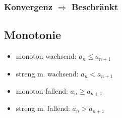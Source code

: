 \subsubsection*{Konvergenz \texorpdfstring{$\Rightarrow$}{folglich} Beschränkt}
\subsection*{Monotonie}
\begin{itemize}[noitemsep, label={}, leftmargin=*]
    \item monoton wachsend: 
    $a_n \leq a_{n+1}$
    \item streng m. wachsend:
    $a_n < a_{n+1}$
    \item monoton fallend:
    $a_n \geq a_{n+1}$
    \item streng m. fallend:
    $a_n > a_{n+1}$
\end{itemize}
